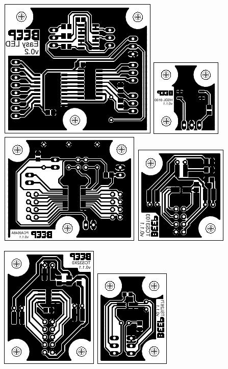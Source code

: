 \documentclass[a4paper]{scrartcl}
\begin{document}
\includegraphics{../Easy_LED}\hspace{5mm}
\includegraphics{../HSDL-9100}\hspace{5mm}
\includegraphics{../PCA9548A}\hspace{5mm}
\includegraphics{../TCS3103}\hspace{5mm}

\includegraphics{../TCS32X0}\hspace{5mm}
\includegraphics{../TSL2671}\hspace{5mm}
\end{document}
